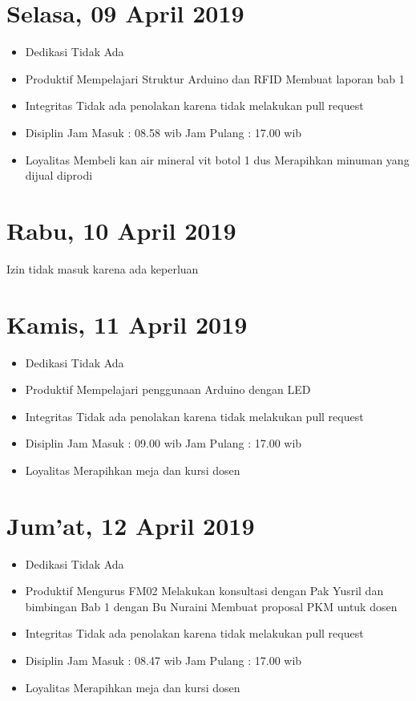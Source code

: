 \section{Selasa, 09 April 2019}
\begin{itemize}
\item Dedikasi
\subitem Tidak Ada
\item Produktif
  \subitem Mempelajari Struktur Arduino dan RFID
  \subitem Membuat laporan bab 1
\item Integritas
  \subitem Tidak ada penolakan karena tidak melakukan pull request
\item Disiplin
  \subitem Jam Masuk : 08.58 wib
  \subitem Jam Pulang : 17.00 wib
\item Loyalitas
  \subitem Membeli kan air mineral vit botol 1 dus
  \subitem Merapihkan minuman yang dijual diprodi
\end{itemize}

\section{Rabu, 10 April 2019}
Izin tidak masuk karena ada keperluan

\section{Kamis, 11 April 2019}
\begin{itemize}
\item Dedikasi
\subitem Tidak Ada
\item Produktif
  \subitem Mempelajari penggunaan Arduino dengan LED
\item Integritas
  \subitem Tidak ada penolakan karena tidak melakukan pull request
\item Disiplin
  \subitem Jam Masuk : 09.00 wib
  \subitem Jam Pulang : 17.00 wib
\item Loyalitas
  \subitem Merapihkan meja dan kursi dosen
\end{itemize}

\section{Jum'at, 12 April 2019}
\begin{itemize}
\item Dedikasi
\subitem Tidak Ada
\item Produktif
  \subitem Mengurus FM02
  \subitem Melakukan konsultasi dengan Pak Yusril dan bimbingan Bab 1 dengan Bu Nuraini
  \subitem Membuat proposal PKM untuk dosen
\item Integritas
  \subitem Tidak ada penolakan karena tidak melakukan pull request
\item Disiplin
  \subitem Jam Masuk : 08.47 wib
  \subitem Jam Pulang : 17.00 wib
\item Loyalitas
  \subitem Merapihkan meja dan kursi dosen
\end{itemize}

